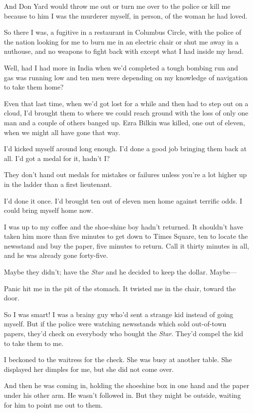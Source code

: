 \documentclass{novel}
\begin{document}
And Don Yard would throw me out or turn me over to the police or kill me because to him I was the murderer myself, in person, of the woman he had loved.

So there I was, a fugitive in a restaurant in Columbus Circle, with the police of the nation looking for me to burn me in an electric chair or shut me away in a nuthouse, and no weapons to fight back with except what I had inside my head. 

Well, had I had more in India when we’d completed a tough bombing run and gas was running low and ten men were depending on my knowledge of navigation to take them home?

Even that last time, when we’d got lost for a while and then had to step out on a cloud, I’d brought them to where we could reach ground with the loss of only one man and a couple of others banged up. Ezra Bilkin was killed, one out of eleven, when we might all have gone that way. 

I’d kicked myself around long enough. I’d done a good job bringing them back at all. I’d got a medal for it, hadn’t I? 

They don’t hand out medals for mistakes or failures unless you’re a lot higher up in the ladder than a first lieutenant.

I’d done it once. I’d brought ten out of eleven men home against terrific odds. I could bring myself home now.

\scenestars

I was up to my coffee and the shoe-shine boy hadn’t returned. It shouldn’t have taken him more than five minutes to get down to Times Square, ten to locate the newsstand and buy the paper, five minutes to return. Call it thirty minutes in all, and he was already gone forty-five.

Maybe they didn’t; have the \textit{Star} and he decided to keep the dollar. Maybe—

Panic hit me in the pit of the stomach. It twisted me in the chair, toward the door.

So I was smart! I was a brainy guy who’d sent a strange kid instead of going myself. But if the police were watching newsstands which sold out-of-town papers, they’d check on everybody who bought the \textit{Star}. They’d compel the kid to take them to me.

I beckoned to the waitress for the check. She was busy at another table. She displayed her dimples for me, but she did not come over.

And then he was coming in, holding the shoeshine box in one hand and the paper under his other arm. He wasn’t followed in. But they might be outside, waiting for him to point me out to them.
\end{document}
